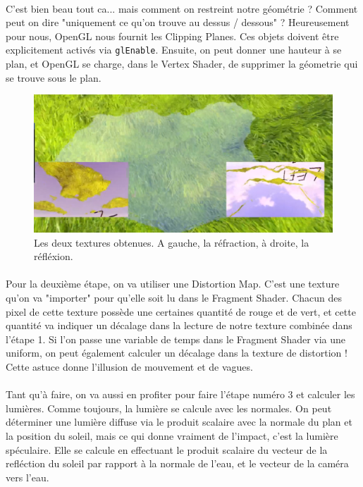 \documentclass{EPUProjetDi}
\newcommand{\code}{\texttt}
\begin{document}
\paragraph{}
C'est bien beau tout ca... mais comment on restreint notre géométrie ? Comment peut on dire "uniquement ce qu'on trouve au dessus / dessous" ?
Heureusement pour nous, OpenGL nous fournit les Clipping Planes. Ces objets doivent être explicitement activés via \code{glEnable}.
Ensuite, on peut donner une hauteur à se plan, et OpenGL se charge, dans le Vertex Shader, de supprimer la géometrie qui se trouve sous le plan.
\begin{figure}[h]
	\centering
	\includegraphics[scale=.3]{water_textures}
	\caption{Les deux textures obtenues. A gauche, la réfraction, à droite, la réfléxion.}
	\label{fig:water_textures}
\end{figure}

\paragraph{}
Pour la deuxième étape, on va utiliser une Distortion Map. C'est une texture qu'on va "importer" pour qu'elle soit lu dans le Fragment Shader.
Chacun des pixel de cette texture possède une certaines quantité de rouge et de vert, et cette quantité va indiquer un décalage dans la lecture de notre texture combinée dans l'étape 1.
Si l'on passe une variable de temps dans le Fragment Shader via une uniform, on peut également calculer un décalage dans la texture de distortion ! Cette astuce donne l'illusion de mouvement et de vagues.

\paragraph{}
Tant qu'à faire, on va aussi en profiter pour faire l'étape numéro 3 et calculer les lumières.
Comme toujours, la lumière se calcule avec les normales. On peut déterminer une lumière diffuse via le produit scalaire avec la normale du plan et la position du soleil, mais ce qui donne vraiment de l'impact, c'est la lumière spéculaire.
Elle se calcule en effectuant le produit scalaire du vecteur de la refléction du soleil par rapport à la normale de l'eau, et le vecteur de la caméra vers l'eau.
\end{document}
